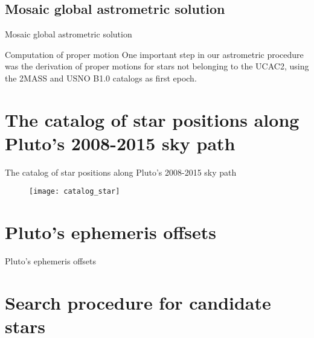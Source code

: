 \subsection*{Mosaic global astrometric solution}

\begin{frame}{Mosaic global astrometric solution}
	
\end{frame}
\begin{frame}[c]{Computation of proper motion}{}
One important step in our astrometric procedure was the derivation of proper motions for stars not belonging to the UCAC2, using the 2MASS and USNO B1.0 catalogs as first epoch.
\end{frame}




\section{The catalog of star positions along Pluto's 2008-2015 sky path}

\begin{frame}{The catalog of star positions along Pluto's 2008-2015 sky path}
	\begin{figure}[tb]
			\texttt{[image: catalog\_star]}
	\end{figure}
\end{frame}


\section{Pluto's ephemeris offsets}


\begin{frame}[c]{Pluto's ephemeris offsets}
	
\end{frame}


\section{Search procedure for candidate stars}


